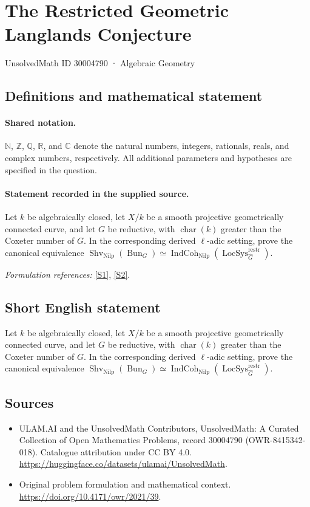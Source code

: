 \documentclass[11pt]{article}
\newcommand{\sref}[2]{\hyperlink{source:#1:#2}{[S#2]}}
\begin{document}
\setcounter{section}{30004789}
\section{The Restricted Geometric Langlands Conjecture}\label{30004790}
{\small UnsolvedMath ID 30004790 · Algebraic Geometry}
\subsection{Definitions and mathematical statement}

\paragraph{Shared notation.}$\mathbb N$, $\mathbb Z$, $\mathbb Q$, $\mathbb R$, and $\mathbb C$ denote the natural numbers, integers, rationals, reals, and complex numbers, respectively. All additional parameters and hypotheses are specified in the question.


\paragraph{Statement recorded in the supplied source.}
Let $k$ be algebraically closed, let $X/k$ be a smooth projective geometrically connected curve, and let $G$ be reductive, with $\operatorname{char}(k)$ greater than the Coxeter number of $G$. In the corresponding derived $\ell$-adic setting, prove the canonical equivalence $\operatorname{Shv}_{\operatorname{Nilp}}(\operatorname{Bun}_G)\simeq\operatorname{IndCoh}_{\operatorname{Nilp}}(\operatorname{LocSys}^{\operatorname{restr}}_{\widehat G})$.
\par\smallskip\textit{Formulation references:} \sref{30004790}{1}, \sref{30004790}{2}.
\subsection{Short English statement}
Let $k$ be algebraically closed, let $X/k$ be a smooth projective geometrically connected curve, and let $G$ be reductive, with $\operatorname{char}(k)$ greater than the Coxeter number of $G$. In the corresponding derived $\ell$-adic setting, prove the canonical equivalence $\operatorname{Shv}_{\operatorname{Nilp}}(\operatorname{Bun}_G)\simeq\operatorname{IndCoh}_{\operatorname{Nilp}}(\operatorname{LocSys}^{\operatorname{restr}}_{\widehat G})$.
\subsection{Sources}
\begin{itemize}
\item[\hypertarget{source:30004790:1}{S1}] ULAM.AI and the UnsolvedMath Contributors, UnsolvedMath: A Curated Collection of Open Mathematics Problems, record 30004790 (OWR-8415342-018). Catalogue attribution under CC BY 4.0.
\url{https://huggingface.co/datasets/ulamai/UnsolvedMath}.
\item[\hypertarget{source:30004790:2}{S2}] Original problem formulation and mathematical context.
\url{https://doi.org/10.4171/owr/2021/39}.
\end{itemize}
\label{end:30004790}
\end{document}
